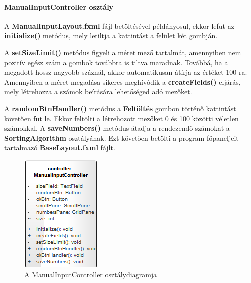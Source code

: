 \documentclass{elteikthesis}
\begin{document}
\paragraph{ManualInputController osztály}
A \textbf{ManualInputLayout.fxml} fájl betöltésével példányosul, ekkor lefut az \textbf{initialize()} metódus, mely letiltja a kattintást a felület két gombján.
\par A \textbf{setSizeLimit()} metódus figyeli a méret mező tartalmát, amennyiben nem pozitív egész szám a gombok továbbra is tiltva maradnak. Továbbá, ha a megadott hossz nagyobb száznál, akkor automatikusan átírja az értéket 100-ra. Amennyiben a méret megadása sikeres meghívódik a \textbf{createFields()} eljárás, mely létrehozza a számok beírására lehetőséged adó mezőket.\par
A \textbf{randomBtnHandler()} metódus a \textbf{Feltöltés} gombon történő kattintást követően fut le. Ekkor feltölti a létrehozott mezőket 0 és 100 közötti véletlen számokkal. A \textbf{saveNumbers()} metódus átadja a rendezendő számokat a \textbf{SortingAlgorithm} osztályának. Ezt követően betölti a program főpaneljeit tartalmazó \textbf{BaseLayout.fxml} fájlt.
\begin{figure}[H]
	\centering
	\includegraphics{pics/class/ManualInputController.png}
	\caption{A ManualInputController osztálydiagramja}
\end{figure}
\end{document}
